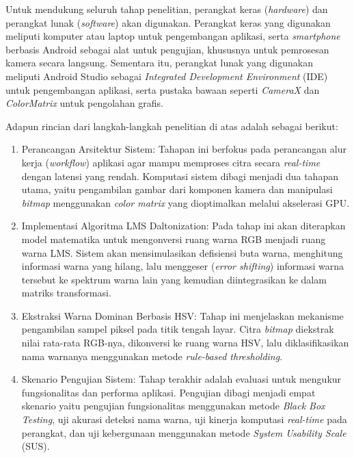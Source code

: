 \setlength{\parindent}{2em} Untuk mendukung seluruh tahap penelitian, perangkat keras (\textit{hardware}) dan perangkat lunak (\textit{software}) akan digunakan.
Perangkat keras yang digunakan meliputi komputer atau laptop untuk pengembangan aplikasi, serta \textit{smartphone} berbasis Android sebagai alat untuk pengujian, khususnya untuk pemrosesan kamera secara langsung.
Sementara itu, perangkat lunak yang digunakan meliputi Android Studio sebagai \textit{Integrated Development Environment} (IDE) untuk pengembangan aplikasi, serta pustaka bawaan seperti \textit{CameraX} dan \textit{ColorMatrix} untuk pengolahan grafis.

Adapun rincian dari langkah-langkah penelitian di atas adalah sebagai berikut:
\begin{enumerate}
  \item Perancangan Arsitektur Sistem:
  Tahapan ini berfokus pada perancangan alur kerja (\textit{workflow}) aplikasi agar mampu memproses citra secara \textit{real-time} dengan latensi yang rendah.
  Komputasi sistem dibagi menjadi dua tahapan utama, yaitu pengambilan gambar dari komponen kamera dan manipulasi \textit{bitmap} menggunakan \textit{color matrix} yang dioptimalkan melalui akselerasi GPU.


  \item Implementasi Algoritma LMS Daltonization:
  Pada tahap ini akan diterapkan model matematika untuk mengonversi ruang warna RGB menjadi ruang warna LMS.
  Sistem akan mensimulasikan defisiensi buta warna, menghitung informasi warna yang hilang, lalu menggeser (\textit{error shifting}) informasi warna tersebut ke spektrum warna lain yang kemudian diintegrasikan ke dalam matriks transformasi.

  \item Ekstraksi Warna Dominan Berbasis HSV:
  Tahap ini menjelaskan mekanisme pengambilan sampel piksel pada titik tengah layar.
  Citra \textit{bitmap} diekstrak nilai rata-rata RGB-nya, dikonversi ke ruang warna HSV, lalu diklasifikasikan nama warnanya menggunakan metode \textit{rule-based thresholding}.

  \item Skenario Pengujian Sistem:
  Tahap terakhir adalah evaluasi untuk mengukur fungsionalitas dan performa aplikasi.
  Pengujian dibagi menjadi empat skenario yaitu pengujian fungsionalitas menggunakan metode \textit{Black Box Testing}, uji akurasi deteksi nama warna, uji kinerja komputasi \textit{real-time} pada perangkat, dan uji kebergunaan menggunakan metode \textit{System Usability Scale} (SUS).

\end{enumerate}

